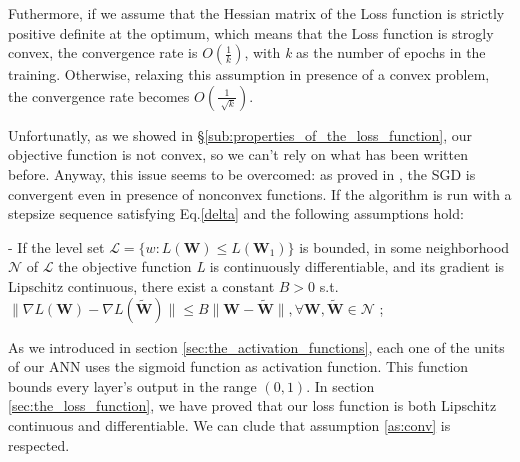 		Futhermore, if we assume that the Hessian matrix of the Loss function is strictly positive definite at the optimum, which means that the Loss function is strogly convex, the convergence rate is $O(\frac{1}{k})$, with \textit{k} as the number of epochs in the training. %
		Otherwise, relaxing this assumption in presence of a convex problem, the convergence rate becomes $O(\frac{1}{\sqrt[]{k}})$\cite{Goodfellow-et-al-2016,Montavon:2012:NNT:2480981,Saad:1999:OLN:304710}.

		Unfortunatly, as we showed in \S\ref{sub:properties_of_the_loss_function}, our objective function is not convex, so we can't rely on what has been written before. Anyway, this issue seems to be overcomed: as proved in \cite{1606.04838}, the SGD is convergent even in presence of nonconvex functions.
		If the algorithm is run with a stepsize sequence satisfying Eq.\ref{delta} and the following assumptions hold:

		\begin{asu} - \label{as:conv}
  				If the level set $\mathcal{L} = \{w : \textit{L}(\textbf{W}) \leq L(\textbf{W}_1)\}$ is bounded,
  				in some neighborhood $\mathcal{N}$ of $\mathcal{L}$ the objective function \textit{L} is
  				continuously differentiable, and its gradient is Lipschitz continuous, there exist a constant $B >
  				0$ s.t. $\|\nabla\textit{L}(\textbf{W})-\nabla\textit{L}(\widetilde{\textbf{W}})\| \leq B\|
  				\textbf{W}-\widetilde{\textbf{W}}\| , \forall \textbf{W},\widetilde{\textbf{W}} \in \mathcal{N}$ ;
		\end{asu}

		As we introduced in section \ref{sec:the_activation_functions}, each one of the units of our ANN uses the
		sigmoid function as activation function. This function bounds every layer's output in the range $(0, 1)$.
		In section \ref{sec:the_loss_function}, we have proved that our loss function is both Lipschitz continuous
		and differentiable. We can clude that assumption \ref{as:conv} is respected.

